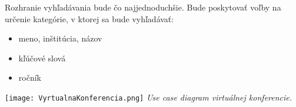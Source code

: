 Rozhranie vyhľadávania bude čo najjednoduchšie. Bude poskytovať voľby na určenie kategórie, v ktorej sa bude vyhľadávať:
\begin{center}
\begin{itemize}
\item meno, inštitúcia, názov
\item kľúčové slová
\item ročník 
\end{itemize}
\end{center}

\begin{center}
\texttt{[image: VyrtualnaKonferencia.png]}
\textit{Use case diagram virtuálnej konferencie.}
\end{center}




